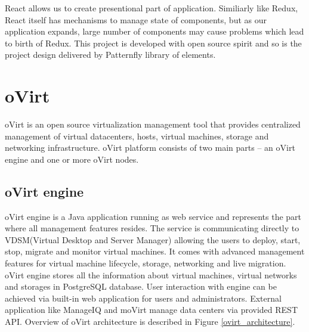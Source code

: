 React allows us to create presentional part of application. Similiarly like Redux, React itself has mechanisms to manage state of components, but as our application expands, large number of components may cause problems which lead to birth of Redux. This project is developed with open source spirit and so is the project design delivered by Patternfly\cite{Patternfly} library of elements.

\chapter{oVirt}
oVirt is an open source virtualization management tool that provides centralized management of virtual datacenters, hosts, virtual machines, storage and networking infrastructure. oVirt platform consists of two main parts -- an oVirt engine and one or more oVirt nodes.


\section{oVirt engine}
oVirt engine is a Java application running as web service and represents the part where all management features resides. The service is communicating directly to VDSM(Virtual Desktop and Server Manager) allowing the users to deploy, start, stop, migrate and monitor virtual machines. It comes with advanced management features for virtual machine lifecycle, storage, networking and live migration. oVirt engine stores all the information about virtual machines, virtual networks and storages in PostgreSQL\cite{postgre} database. User interaction with engine can be achieved via built-in web application for users and administrators. External application like ManageIQ and moVirt manage data centers via provided REST API. Overview of oVirt architecture is described in Figure \ref{ovirt_architecture}.

